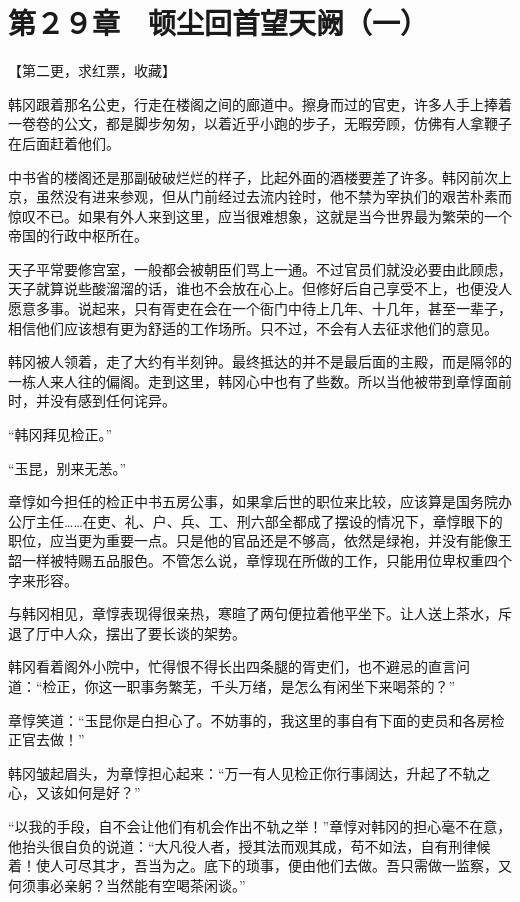 \section{第２９章　顿尘回首望天阙（一）}

【第二更，求红票，收藏】

韩冈跟着那名公吏，行走在楼阁之间的廊道中。擦身而过的官吏，许多人手上捧着一卷卷的公文，都是脚步匆匆，以着近乎小跑的步子，无暇旁顾，仿佛有人拿鞭子在后面赶着他们。

中书省的楼阁还是那副破破烂烂的样子，比起外面的酒楼要差了许多。韩冈前次上京，虽然没有进来参观，但从门前经过去流内铨时，他不禁为宰执们的艰苦朴素而惊叹不已。如果有外人来到这里，应当很难想象，这就是当今世界最为繁荣的一个帝国的行政中枢所在。

天子平常要修宫室，一般都会被朝臣们骂上一通。不过官员们就没必要由此顾虑，天子就算说些酸溜溜的话，谁也不会放在心上。但修好后自己享受不上，也便没人愿意多事。说起来，只有胥吏在会在一个衙门中待上几年、十几年，甚至一辈子，相信他们应该想有更为舒适的工作场所。只不过，不会有人去征求他们的意见。

韩冈被人领着，走了大约有半刻钟。最终抵达的并不是最后面的主殿，而是隔邻的一栋人来人往的偏阁。走到这里，韩冈心中也有了些数。所以当他被带到章惇面前时，并没有感到任何诧异。

“韩冈拜见检正。”

“玉昆，别来无恙。”

章惇如今担任的检正中书五房公事，如果拿后世的职位来比较，应该算是国务院办公厅主任……在吏、礼、户、兵、工、刑六部全都成了摆设的情况下，章惇眼下的职位，应当更为重要一点。只是他的官品还是不够高，依然是绿袍，并没有能像王韶一样被特赐五品服色。不管怎么说，章惇现在所做的工作，只能用位卑权重四个字来形容。

与韩冈相见，章惇表现得很亲热，寒暄了两句便拉着他平坐下。让人送上茶水，斥退了厅中人众，摆出了要长谈的架势。

韩冈看着阁外小院中，忙得恨不得长出四条腿的胥吏们，也不避忌的直言问道：“检正，你这一职事务繁芜，千头万绪，是怎么有闲坐下来喝茶的？”

章惇笑道：“玉昆你是白担心了。不妨事的，我这里的事自有下面的吏员和各房检正官去做！”

韩冈皱起眉头，为章惇担心起来：“万一有人见检正你行事阔达，升起了不轨之心，又该如何是好？”

“以我的手段，自不会让他们有机会作出不轨之举！”章惇对韩冈的担心毫不在意，他抬头很自负的说道：“大凡役人者，授其法而观其成，苟不如法，自有刑律候着！使人可尽其才，吾当为之。底下的琐事，便由他们去做。吾只需做一监察，又何须事必亲躬？当然能有空喝茶闲谈。”

